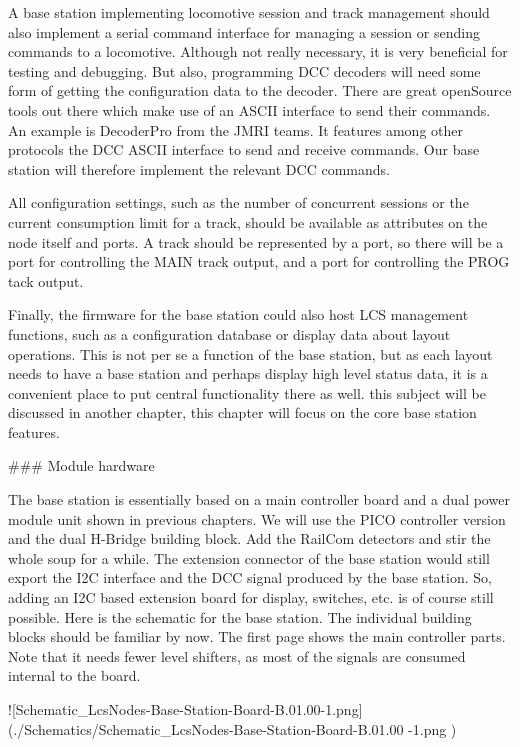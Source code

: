 A base station implementing locomotive session and track management should also implement a serial command interface for managing a session or sending commands to a locomotive. Although not really necessary, it is very beneficial for testing and debugging. But also, programming DCC decoders will need some form of getting the configuration data to the decoder. There are great openSource tools out there which make use of an ASCII interface to send their commands. An example is DecoderPro from the JMRI teams. It features among other protocols the DCC\+\+ ASCII interface to send and receive commands. Our base station will therefore implement the relevant DCC\+\+ commands.

All configuration settings, such as the number of concurrent sessions or the current consumption limit for a track, should be available as attributes on the node itself and ports. A track should be represented by a port, so there will be a port for controlling the MAIN track output, and a port for controlling the PROG tack output.

Finally, the firmware for the base station could also host LCS management functions, such as a configuration database or display data about layout operations. This is not per se a function of the base station, but as each layout needs to have a base station and perhaps display high level status data, it is a convenient place to put central functionality there as well. this subject will be discussed in another chapter, this chapter will focus on the core base station features.

### Module hardware

The base station is essentially based on a main controller board and a dual power module unit shown in previous chapters. We will use the PICO controller version and the dual H-Bridge building block. Add the RailCom detectors and stir the whole soup for a while. The extension connector of the base station would still export the I2C interface and the DCC signal produced by the base station. So, adding an I2C based extension board for display, switches, etc. is of course still possible. Here is the schematic for the base station. The individual building blocks should be familiar by now. The first page shows the main controller parts. Note that it needs fewer level shifters, as most of the signals are consumed internal to the board.

![Schematic_LcsNodes-Base-Station-Board-B.01.00-1.png](./Schematics/Schematic_LcsNodes-Base-Station-Board-B.01.00
-1.png )


